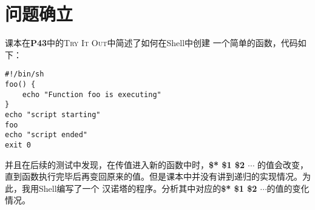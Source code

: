 \newpage
\section{问题确立}
课本在\textbf{P43}中的\textsc{Try It Out}中简述了如何在Shell中创建
一个简单的函数，代码如下：
\lstset{language=bash}
\begin{lstlisting}[caption = Try It Out]
#!/bin/sh
foo() {
    echo "Function foo is executing"
}
echo "script starting"
foo
echo "script ended"
exit 0
\end{lstlisting}
\par 
并且在后续的测试中发现，在传值进入新的函数中时，\textbf{\$* \$1 \$2 $\cdots$} 的值会改变，
直到函数执行完毕后再变回原来的值。但是课本中并没有讲到递归的实现情况。为此，我用Shell编写了一个
汉诺塔的程序。分析其中对应的\textbf{\$* \$1 \$2 $\cdots$}的值的变化情况。